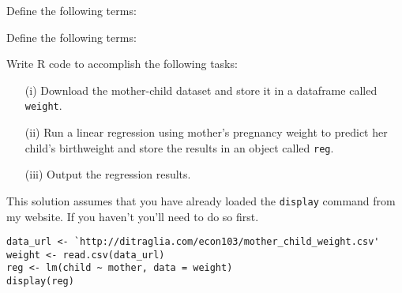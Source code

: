 \documentclass[addpoints,12pt]{exam}
\begin{document}
\begin{questions}
\question Define the following terms:

\question Define the following terms:


\question Write R code to accomplish the following tasks: 
\begin{enumerate} 
  \item[(i)] Download the mother-child dataset and store it in a dataframe called \texttt{weight}.
  \item[(ii)] Run a linear regression using mother's pregnancy weight to predict her child's birthweight and store the results in an object called \texttt{reg}.
  \item[(iii)] Output the regression results. 
\end{enumerate}
\begin{solution}
  This solution assumes that you have already loaded the \texttt{display} command from my website. If you haven't you'll need to do so first.
\begin{verbatim}
data_url <- `http://ditraglia.com/econ103/mother_child_weight.csv'
weight <- read.csv(data_url)
reg <- lm(child ~ mother, data = weight)
display(reg)
\end{verbatim}
\end{solution}


\end{questions}
\end{document}
